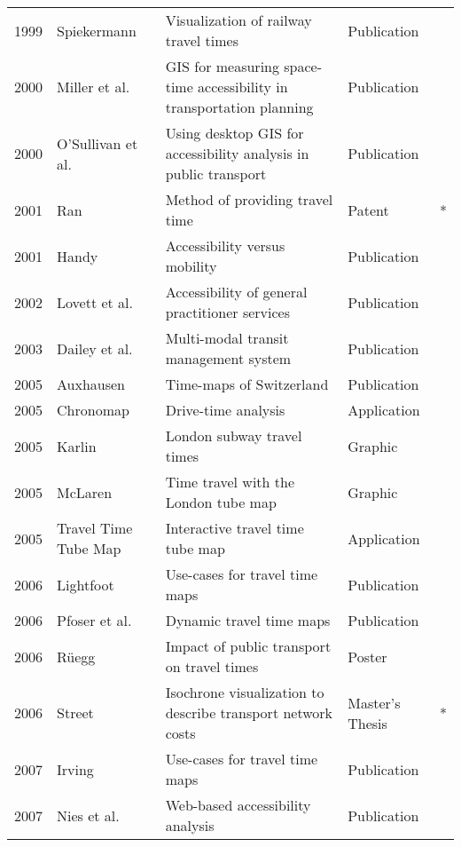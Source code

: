\begin{table}[htb]
\begin{tabular}{r|l|l|l|c}
      1999 & Spiekermann \cite{spiekermann1999visualisierung} & Visualization of railway travel times & Publication & \\
      2000 & Miller et al. \cite{miller2000gis} & GIS for measuring space-time accessibility in transportation planning & Publication & \\
      2000 & O'Sullivan et al. \cite{o2000using} & Using desktop GIS for accessibility analysis in public transport  & Publication  & \\
      2001 & Ran \cite{ran2001method} &  Method of providing travel time  & Patent & * \\
      2001 & Handy \cite{handy2002accessibility} & Accessibility versus mobility & Publication & \\
      2002 & Lovett et al. \cite{lovett2002car} & Accessibility of general practitioner services  & Publication  & \\
      2003 & Dailey et al. \cite{dailey2003design} &  Multi-modal transit management system & Publication  & \\
      2005 & Auxhausen \cite{axhausen2005zeitkarten} & Time-maps of Switzerland  & Publication  & \\
      2005 & Chronomap \cite{Chronomap} & Drive-time analysis  & Application  & \\
      2005 & Karlin \cite{Karlin2005}  & London subway travel times  & Graphic & \\
      2005 & McLaren \cite{McLaren2005} & Time travel with the London tube map  & Graphic  & \\
      2005 & Travel Time Tube Map \cite{Carden2006} & Interactive travel time tube map  & Application  & \\
      2006 & Lightfoot \cite{Lightfoot2006} & Use-cases for travel time maps  &  Publication  & \\
      2006 & Pfoser et al. \cite{pfoser2006dynamic} &  Dynamic travel time maps & Publication  & \\
      2006 & Rüegg \cite{Ruegg2006} & Impact of public transport on travel times  & Poster & \\
      2006 & Street \cite{street2006timecontours} & Isochrone visualization to describe transport network costs  & Master's Thesis  & * \\
      2007 & Irving \cite{Irving2007} & Use-cases for travel time maps  & Publication  & \\
      2007 & Nies et al. \cite{neis2007webbasierte} & Web-based accessibility analysis  & Publication  & \\

\end{tabular}
\end{table}
